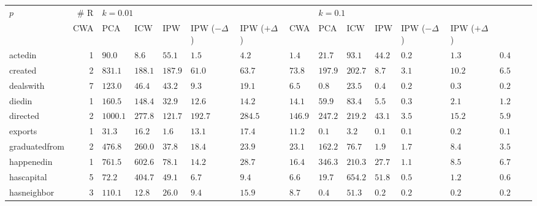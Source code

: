 \begin{tabular}{lr|lllllll|lllllll}
\toprule
           $p$ & \# R & \multicolumn{6}{l}{$k=0.01$} & \multicolumn{6}{l}{$k=0.1$} \\
               &          CWA &      PCA &          ICW &          IPW & IPW ($-\Delta$) & IPW ($+\Delta$) &      CWA &     PCA &     ICW &         IPW & IPW ($-\Delta$) & IPW ($+\Delta$) \\
\midrule
       actedin &    1 &       $90.0$ &    $8.6$ &       $55.1$ &   $\bm{1.5}$ &           $4.2$ &           $1.4$ &   $21.7$ &  $93.1$ &  $44.2$ &  $\bm{0.2}$ &           $1.3$ &           $0.4$ \\
       created &    2 &      $831.1$ &  $188.1$ &      $187.9$ &  $\bm{61.0}$ &          $63.7$ &          $73.8$ &  $197.9$ & $202.7$ &   $8.7$ &  $\bm{3.1}$ &          $10.2$ &           $6.5$ \\
     dealswith &    7 &      $123.0$ &   $46.4$ &       $43.2$ &   $\bm{9.3}$ &          $19.1$ &           $6.5$ &    $0.8$ &  $23.5$ &   $0.4$ &  $\bm{0.2}$ &           $0.3$ &           $0.2$ \\
        diedin &    1 &      $160.5$ &  $148.4$ &       $32.9$ &  $\bm{12.6}$ &          $14.2$ &          $14.1$ &   $59.9$ &  $83.4$ &   $5.5$ &  $\bm{0.3}$ &           $2.1$ &           $1.2$ \\
      directed &    2 &     $1000.1$ &  $277.8$ & $\bm{121.7}$ &      $192.7$ &         $284.5$ &         $146.9$ &  $247.2$ & $219.2$ &  $43.1$ &  $\bm{3.5}$ &          $15.2$ &           $5.9$ \\
       exports &    1 &       $31.3$ &   $16.2$ &   $\bm{1.6}$ &       $13.1$ &          $17.4$ &          $11.2$ &    $0.1$ &   $3.2$ &   $0.1$ &  $\bm{0.1}$ &           $0.2$ &           $0.1$ \\
 graduatedfrom &    2 &      $476.8$ &  $260.0$ &       $37.8$ &  $\bm{18.4}$ &          $23.9$ &          $23.1$ &  $162.2$ &  $76.7$ &   $1.9$ &  $\bm{1.7}$ &           $8.4$ &           $3.5$ \\
    happenedin &    1 &      $761.5$ &  $602.6$ &       $78.1$ &  $\bm{14.2}$ &          $28.7$ &          $16.4$ &  $346.3$ & $210.3$ &  $27.7$ &  $\bm{1.1}$ &           $8.5$ &           $6.7$ \\
    hascapital &    5 &       $72.2$ &  $404.7$ &       $49.1$ &   $\bm{6.7}$ &           $9.4$ &           $6.6$ &   $19.7$ & $654.2$ &  $51.8$ &  $\bm{0.5}$ &           $1.2$ &           $0.6$ \\
   hasneighbor &    3 &      $110.1$ &   $12.8$ &       $26.0$ &   $\bm{9.4}$ &          $15.9$ &           $8.7$ &    $0.4$ &  $51.3$ &   $0.2$ &  $\bm{0.2}$ &           $0.2$ &           $0.2$ \\

\end{tabular}
